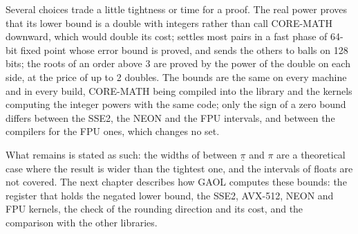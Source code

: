 \medskip
Several choices trade a little tightness or time for a proof. The real
power proves that its lower bound is a double with integers rather than
call CORE-MATH downward, which would double its cost; 
settles most pairs in a fast phase of 64-bit fixed point whose error bound
is proved, and sends the others to balls on 128 bits; the roots of an
order above 3 are proved by the power of the double on each side, at the
price of up to 2 doubles. The bounds are the same on every machine and in
every build, CORE-MATH being compiled into the library and the kernels
computing the integer powers with the same code; only the sign of a zero
bound differs between the SSE2, the NEON and the FPU intervals, and
between the compilers for the FPU ones, which changes no set.

\medskip
What remains is stated as such: the widths of  between
$\underline{\pi}$ and $\pi$ are a theoretical case where the result is wider
than the tightest one, and the intervals of floats are not covered. The next chapter
describes how GAOL computes these bounds: the register that holds the
negated lower bound, the SSE2, AVX-512, NEON and FPU kernels, the check of
the rounding direction and its cost, and the comparison with the other
libraries.
